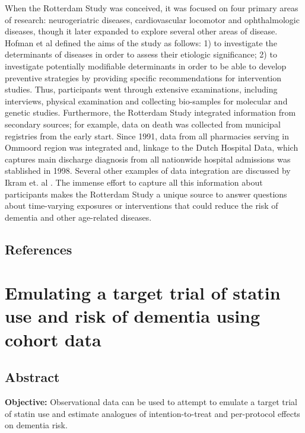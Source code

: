 \documentclass[
]{book}
\begin{document}
When the Rotterdam Study was conceived, it was focused on four primary areas of research: neurogeriatric diseases, cardiovascular locomotor and ophthalmologic diseases, though it later expanded to explore several other areas of disease. Hofman et al defined the aims of the study as follows: 1) to investigate the determinants of diseases in order to assess their etiologic significance; 2) to investigate potentially modifiable determinants in order to be able to develop preventive strategies by providing specific recommendations for intervention studies\autocite{hofman1991}. Thus, participants went through extensive examinations, including interviews, physical examination and collecting bio-samples for molecular and genetic studies. Furthermore, the Rotterdam Study integrated information from secondary sources; for example, data on death was collected from municipal registries from the early start. Since 1991, data from all pharmacies serving in Ommoord region was integrated and, linkage to the Dutch Hospital Data, which captures main discharge diagnosis from all nationwide hospital admissions was stablished in 1998. Several other examples of data integration are discussed by Ikram et. al \autocite{ikram2020}. The immense effort to capture all this information about participants makes the Rotterdam Study a unique source to answer questions about time-varying exposures or interventions that could reduce the risk of dementia and other age-related diseases.

\newpage

\hypertarget{references}{%
\section{References}\label{references}}

\hypertarget{chapter2}{%
\chapter{Emulating a target trial of statin use and risk of dementia using cohort data}\label{chapter2}}


\newpage

\hypertarget{abstract}{%
\section{Abstract}\label{abstract}}

\textbf{Objective:} Observational data can be used to attempt to emulate a target trial of statin use and estimate analogues of intention-to-treat and per-protocol effects on dementia risk.
\end{document}
